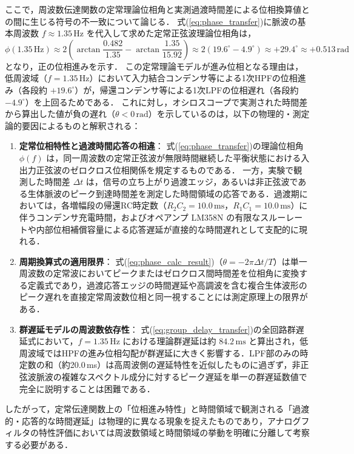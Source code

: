 ここで，周波数伝達関数の定常理論位相角と実測過渡時間差による位相換算値との間に生じる符号の不一致について論じる．
式(\ref{eq:phase_transfer})に脈波の基本周波数 $f \approx 1.35\,\mathrm{Hz}$ を代入して求めた定常正弦波理論位相角は，
\begin{equation}
  \phi(1.35\,\mathrm{Hz}) \approx 2 \left( \arctan\frac{0.482}{1.35} - \arctan\frac{1.35}{15.92} \right) \approx 2 (19.6^\circ - 4.9^\circ) \approx +29.4^\circ \approx +0.513\,\mathrm{rad}
\end{equation}
となり，正の位相進みを示す．
この定常理論モデルが進み位相となる理由は，低周波域（$f = 1.35\,\mathrm{Hz}$）において入力結合コンデンサ等による1次HPFの位相進み（各段約 $+19.6^\circ$）が，帰還コンデンサ等による1次LPFの位相遅れ（各段約 $-4.9^\circ$）を上回るためである．
これに対し，オシロスコープで実測された時間差から算出した値が負の遅れ（$\theta < 0\,\mathrm{rad}$）を示しているのは，以下の物理的・測定論的要因によるものと解釈される：
\begin{enumerate}
  \item \textbf{定常位相特性と過渡時間応答の相違}：
        式(\ref{eq:phase_transfer})の理論位相角 $\phi(f)$ は，同一周波数の定常正弦波が無限時間継続した平衡状態における入出力正弦波のゼロクロス位相関係を規定するものである．
        一方，実験で観測した時間差 $\Delta t$ は，信号の立ち上がり過渡エッジ，あるいは非正弦波である生体脈波のピーク到達時間差を測定した時間領域の応答である．過渡期においては，各増幅段の帰還RC時定数（$R_2 C_2 = 10.0\,\mathrm{ms}$，$R_1 C_1 = 10.0\,\mathrm{ms}$）に伴うコンデンサ充電時間，およびオペアンプ LM358N の有限なスルーレートや内部位相補償容量による応答遅延が直接的な時間遅れとして支配的に現れる．
  \item \textbf{周期換算式の適用限界}：
        式(\ref{eq:phase_calc_result})（$\theta = -2\pi \Delta t / T$）は単一周波数の定常波においてピークまたはゼロクロス間時間差を位相角に変換する定義式であり，過渡応答エッジの時間遅延や高調波を含む複合生体波形のピーク遅れを直接定常周波数位相と同一視することには測定原理上の限界がある．
  \item \textbf{群遅延モデルの周波数依存性}：
        式(\ref{eq:group_delay_transfer})の全回路群遅延式において，$f = 1.35\,\mathrm{Hz}$ における理論群遅延は約 $84.2\,\mathrm{ms}$ と算出され，低周波域ではHPFの進み位相勾配が群遅延に大きく影響する．LPF部のみの時定数の和（約20.0\,ms）は高周波側の遅延特性を近似したものに過ぎず，非正弦波脈波の複雑なスペクトル成分に対するピーク遅延を単一の群遅延数値で完全に説明することは困難である．
\end{enumerate}
したがって，定常伝達関数上の「位相進み特性」と時間領域で観測される「過渡的・応答的な時間遅延」は物理的に異なる現象を捉えたものであり，アナログフィルタの特性評価においては周波数領域と時間領域の挙動を明確に分離して考察する必要がある．


